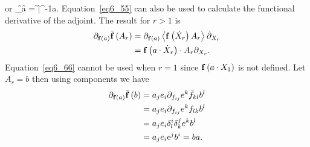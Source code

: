 or
\be
	\partial_{\f{\fbld}{a}}\f{\det}{\fbld} = \f{\det}{\fbld}\f{\bar{\fbld}^{-1}}{a}.
\ee
Equation~\ref{eq6_55} can also be used to calculate the functional derivative of the adjoint.  The result for $r>1$ is
\begin{align}
	\partial_{{\mathbf{f}}\left ( {a} \right )}{\bar{\mathbf{f}}}\left ( {A_{r}} \right ) &= \partial_{{\mathbf{f}}\left ( {a} \right )}\left \langle {{\mathbf{f}}\left ({\dot{X}_{r}} \right )A_{r}} \right \rangle_{}\dot{\partial}_{X_{r}} \nonumber \\
	                                              &= {\mathbf{f}}\left ( {a\cdot \dot{X}_{r}} \right )\cdot A_{r}\partial_{X_{r}}. \label{eq6_66}
\end{align}
Equation~\ref{eq6_66} cannot be used when $r=1$ since ${\mathbf{f}}\left ( {a\cdot X_{1}} \right )$ is not defined. Let $A_{r}=b$ then using components we have
\begin{align}
	\partial_{{\mathbf{f}}\left ( {a} \right )}{\bar{\mathbf{f}}}\left ( {b} \right ) &= a_{j}e_{i}\partial_{f_{ij}}e^{k}\bar{f}_{kl}b^{l} \nonumber \\
	                                          &= a_{j}e_{i}\partial_{f_{ij}}e^{k}f_{lk}b^{l} \nonumber \\
	                                          &= a_{j}e_{i}\delta_{l}^{i}\delta_{k}^{j}e^{k}b^{l} \nonumber \\
	                                          &= a_{j}e_{i}\mbox{e}^{j}b^{i} = ba.
\end{align}
